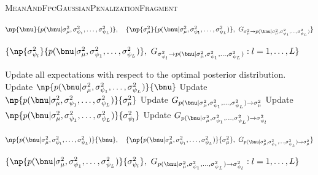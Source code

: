 \documentclass[12pt]{article}
\def\sigsqmu{\sigma^2_{\mu}}
\newcommand\sigsqpsi[1]{\sigma^2_{\psi_{#1}}}
\theoremstyle{plain}
\theoremstyle{definition}
\theoremstyle{remark}
\begin{document}
\begin{algorithm}
	\caption{
		\textsc{MeanAndFpcGaussianPenalizationFragment}
	}
	\label{alg:mean_fpc_gauss_pen_frag}
	\begin{algorithmic}[1]
		\Inputs
			\begin{varwidth}[t]{\linewidth} $
				\np{\bnu}{p (\bnu | \sigsqmu, \sigsqpsi{1}, \dots, \sigsqpsi{L})}, \quad
				\{
					\np{\sigsqmu}{p (\bnu | \sigsqmu, \sigsqpsi{1}, \dots, \sigsqpsi{L})}, \
					G_{\sigsqmu \rightarrow p (\bnu | \sigsqmu, \sigsqpsi{1}, \dots, \sigsqpsi{L})}
				\}
			$\par$
				\{
					\np{\sigsqpsi{l}}{p (\bnu | \sigsqmu, \sigsqpsi{1}, \dots, \sigsqpsi{L})}, \
					G_{\sigsqpsi{l} \rightarrow p (\bnu | \sigsqmu, \sigsqpsi{1}, \dots, \sigsqpsi{L})} :
					l = 1, \dots, L
				\}
			$ \end{varwidth}
		\Updates
			\State Update all expectations with respect to the optimal posterior distribution.
			\State Update $\np{p (\bnu | \sigsqmu, \sigsqpsi{1}, \dots, \sigsqpsi{L})}{\bnu}$
				\Comment{equation \eqref{np_pen_nu}}
			\State Update $\np{p (\bnu | \sigsqmu, \sigsqpsi{1}, \dots, \sigsqpsi{L})}{\sigsqmu}$
			\State Update $G_{p (\bnu | \sigsqmu, \sigsqpsi{1}, \dots, \sigsqpsi{L}) \rightarrow \sigsqmu}$
			\For{$l = 1, \dots, L$}
				\State Update $\np{p (\bnu | \sigsqmu, \sigsqpsi{1}, \dots, \sigsqpsi{L})}{\sigsqpsi{l}}$
				\State Update $G_{p (\bnu | \sigsqmu, \sigsqpsi{1}, \dots, \sigsqpsi{L}) \rightarrow \sigsqpsi{l}}$
			\EndFor
		\Outputs
			\begin{varwidth}[t]{\linewidth} $
				\np{p (\bnu | \sigsqmu, \sigsqpsi{1}, \dots, \sigsqpsi{L})}{\bnu}, \quad
				\{
					\np{p (\bnu | \sigsqmu, \sigsqpsi{1}, \dots, \sigsqpsi{L})}{\sigsqmu}, \
					G_{p (\bnu | \sigsqmu, \sigsqpsi{1}, \dots, \sigsqpsi{L}) \rightarrow \sigsqmu}
				\}
			$\par$
				\{
					\np{p (\bnu | \sigsqmu, \sigsqpsi{1}, \dots, \sigsqpsi{L})}{\sigsqpsi{l}}, \
					G_{p (\bnu | \sigsqmu, \sigsqpsi{1}, \dots, \sigsqpsi{L}) \rightarrow \sigsqpsi{l}} :
					l = 1, \dots, L
				\}
			$ \end{varwidth}
	\end{algorithmic}
\end{algorithm}

\end{document}

